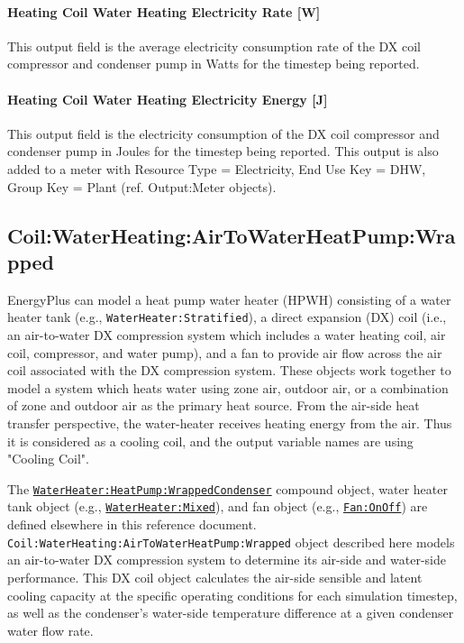 \paragraph{Heating Coil Water Heating Electricity Rate {[}W{]}}\label{heating-coil-water-heating-electric-powerw}

This output field is the average electricity consumption rate of the DX coil compressor and condenser pump in Watts for the timestep being reported.

\paragraph{Heating Coil Water Heating Electricity Energy {[}J{]}}\label{heating-coil-water-heating-electric-energy-j}

This output field is the electricity consumption of the DX coil compressor and condenser pump in Joules for the timestep being reported. This output is also added to a meter with Resource Type = Electricity, End Use Key = DHW, Group Key = Plant (ref. Output:Meter objects).


\subsection{Coil:WaterHeating:AirToWaterHeatPump:Wrapped}\label{coilwaterheatingairtowaterheatpumpwrapped}

EnergyPlus can model a heat pump water heater (HPWH) consisting of a water heater tank (e.g., \lstinline!WaterHeater:Stratified!), a direct expansion (DX) coil (i.e., an air-to-water DX compression system which includes a water heating coil, air coil, compressor, and water pump), and a fan to provide air flow across the air coil associated with the DX compression system. These objects work together to model a system which heats water using zone air, outdoor air, or a combination of zone and outdoor air as the primary heat source. From the air-side heat transfer perspective, the water-heater receives heating energy from the air. Thus it is considered as a cooling coil, and the output variable names are using "Cooling Coil".

The \hyperref[waterheaterheatpumpwrappedcondenser]{\lstinline!WaterHeater:HeatPump:WrappedCondenser!} compound object, water heater tank object (e.g., \hyperref[waterheatermixed]{\lstinline!WaterHeater:Mixed!}), and fan object (e.g., \hyperref[fanonoff]{\lstinline!Fan:OnOff!}) are defined elsewhere in this reference document. \lstinline!Coil:WaterHeating:AirToWaterHeatPump:Wrapped! object described here models an air-to-water DX compression system to determine its air-side and water-side performance. This DX coil object calculates the air-side sensible and latent cooling capacity at the specific operating conditions for each simulation timestep, as well as the condenser's water-side temperature difference at a given condenser water flow rate.

